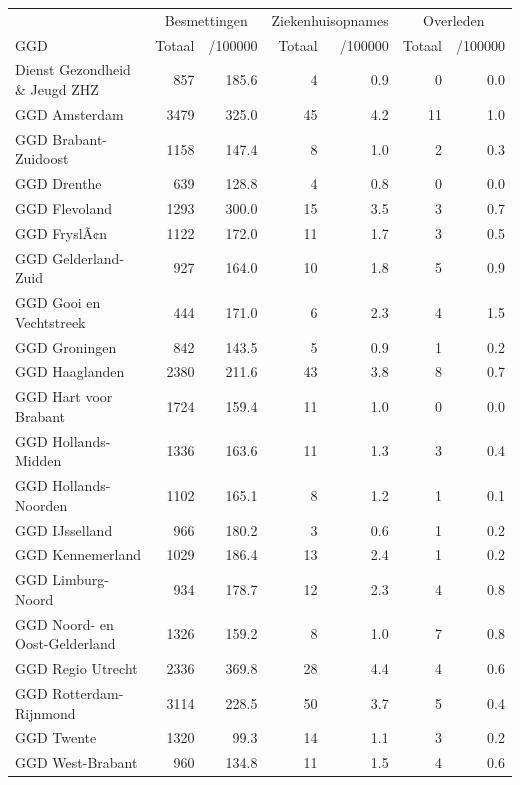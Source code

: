 \documentclass[
  english,
  man,floatsintext]{apa6}
\begin{document}
\begin{table}
\centering\begingroup\fontsize{10}{12}\selectfont

\begin{threeparttable}
\begin{tabular}{lrrrrrr}
\toprule
\multicolumn{1}{c}{ } & \multicolumn{2}{c}{Besmettingen} & \multicolumn{2}{c}{Ziekenhuisopnames} & \multicolumn{2}{c}{Overleden} \\
\cmidrule(l{3pt}r{3pt}){2-3} \cmidrule(l{3pt}r{3pt}){4-5} \cmidrule(l{3pt}r{3pt}){6-7}
GGD & Totaal & /100000 & Totaal & /100000 & Totaal & /100000\\
\midrule
Dienst Gezondheid \& Jeugd ZHZ & 857 & 185.6 & 4 & 0.9 & 0 & 0.0\\
GGD Amsterdam & 3479 & 325.0 & 45 & 4.2 & 11 & 1.0\\
GGD Brabant-Zuidoost & 1158 & 147.4 & 8 & 1.0 & 2 & 0.3\\
GGD Drenthe & 639 & 128.8 & 4 & 0.8 & 0 & 0.0\\
GGD Flevoland & 1293 & 300.0 & 15 & 3.5 & 3 & 0.7\\
GGD FryslÃ¢n & 1122 & 172.0 & 11 & 1.7 & 3 & 0.5\\
GGD Gelderland-Zuid & 927 & 164.0 & 10 & 1.8 & 5 & 0.9\\
GGD Gooi en Vechtstreek & 444 & 171.0 & 6 & 2.3 & 4 & 1.5\\
GGD Groningen & 842 & 143.5 & 5 & 0.9 & 1 & 0.2\\
GGD Haaglanden & 2380 & 211.6 & 43 & 3.8 & 8 & 0.7\\
GGD Hart voor Brabant & 1724 & 159.4 & 11 & 1.0 & 0 & 0.0\\
GGD Hollands-Midden & 1336 & 163.6 & 11 & 1.3 & 3 & 0.4\\
GGD Hollands-Noorden & 1102 & 165.1 & 8 & 1.2 & 1 & 0.1\\
GGD IJsselland & 966 & 180.2 & 3 & 0.6 & 1 & 0.2\\
GGD Kennemerland & 1029 & 186.4 & 13 & 2.4 & 1 & 0.2\\
GGD Limburg-Noord & 934 & 178.7 & 12 & 2.3 & 4 & 0.8\\
GGD Noord- en Oost-Gelderland & 1326 & 159.2 & 8 & 1.0 & 7 & 0.8\\
GGD Regio Utrecht & 2336 & 369.8 & 28 & 4.4 & 4 & 0.6\\
GGD Rotterdam-Rijnmond & 3114 & 228.5 & 50 & 3.7 & 5 & 0.4\\
GGD Twente & 1320 & 99.3 & 14 & 1.1 & 3 & 0.2\\
GGD West-Brabant & 960 & 134.8 & 11 & 1.5 & 4 & 0.6\\

\end{tabular}
\end{threeparttable}
\end{table}
\end{document}
